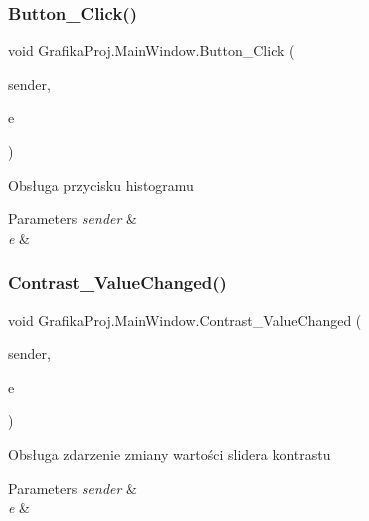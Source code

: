 \subsubsection{\texorpdfstring{Button\_Click()}{Button\_Click()}}
{\footnotesize\ttfamily void Grafika\+Proj.\+Main\+Window.\+Button\+\_\+\+Click (\begin{DoxyParamCaption}\item[{object}]{sender,  }\item[{Routed\+Event\+Args}]{e }\end{DoxyParamCaption})\hspace{0.3cm}{\ttfamily [private]}}



Obsługa przycisku histogramu 


\begin{DoxyParams}{Parameters}
{\em sender} & \\
\hline
{\em e} & \\
\hline
\end{DoxyParams}
\mbox{\label{class_grafika_proj_1_1_main_window_a994f218057b535a3f002eb42fca0ecd0}} 
\subsubsection{\texorpdfstring{Contrast\_ValueChanged()}{Contrast\_ValueChanged()}}
{\footnotesize\ttfamily void Grafika\+Proj.\+Main\+Window.\+Contrast\+\_\+\+Value\+Changed (\begin{DoxyParamCaption}\item[{object}]{sender,  }\item[{Routed\+Property\+Changed\+Event\+Args$<$ double $>$}]{e }\end{DoxyParamCaption})\hspace{0.3cm}{\ttfamily [private]}}



Obsługa zdarzenie zmiany wartości slider\textquotesingle{}a kontrastu 


\begin{DoxyParams}{Parameters}
{\em sender} & \\
\hline
{\em e} & \\
\hline
\end{DoxyParams}
\mbox{\label{class_grafika_proj_1_1_main_window_a3e949c359663048bc3d28baab78111f0}} 
